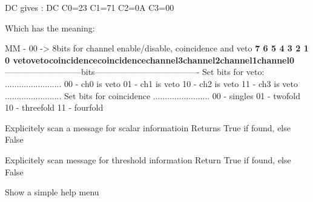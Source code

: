 \documentclass[letterpaper,10pt,english]{sphinxmanual}
\begin{document}
\begin{fulllineitems}
\begin{fulllineitems}
DC gives :
DC C0=23 C1=71 C2=0A C3=00

Which has the meaning:

MM - 00 -\textgreater{} 8bits for channel enable/disable, coincidence and veto
{\color{red}\bfseries{}\textbar{}7   \textbar{}6   \textbar{}5          \textbar{}4          \textbar{}3       \textbar{}2       \textbar{}1 \textbar{}0       \textbar{}
\textbar{}veto\textbar{}veto\textbar{}coincidence\textbar{}coincidence\textbar{}channel3\textbar{}channel2\textbar{}channel1\textbar{}channel0\textbar{}}
---------------------------bits-------------------------------------
Set bits for veto:
........................
00 - ch0 is veto
01 - ch1 is veto
10 - ch2 is veto
11 - ch3 is veto
........................
Set bits for coincidence
........................
00 - singles
01 - twofold
10 - threefold
11 - fourfold

\end{fulllineitems}


\begin{fulllineitems}
\label{muonic:muonic.gui.MainWindow.MainWindow.get_scalars_from_queue}
Explicitely scan a message for scalar informatioin
Returns True if found, else False

\end{fulllineitems}


\begin{fulllineitems}
\label{muonic:muonic.gui.MainWindow.MainWindow.get_thresholds_from_queue}
Explicitely scan message for threshold information
Return True if found, else False

\end{fulllineitems}


\begin{fulllineitems}
\label{muonic:muonic.gui.MainWindow.MainWindow.help_menu}
Show a simple help menu

\end{fulllineitems}



\end{fulllineitems}
\end{document}
